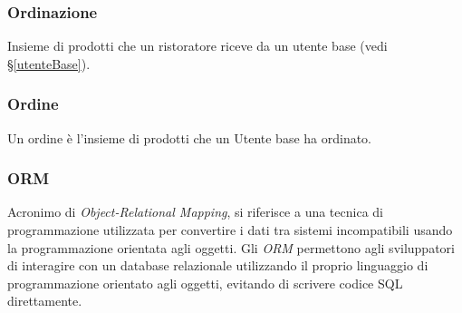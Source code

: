 
\subsubsection*{Ordinazione}
Insieme di prodotti che un ristoratore riceve da un utente base (vedi
\S\ref{utenteBase}).

\subsubsection*{Ordine}
\label{ordine}
Un ordine è l'insieme di prodotti che un Utente base ha ordinato.

\subsubsection*{ORM}
Acronimo di \textit{Object-Relational Mapping}, si riferisce a una tecnica di programmazione 
utilizzata per convertire i dati tra sistemi incompatibili usando la programmazione orientata agli oggetti. 
Gli \textit{ORM} permettono agli sviluppatori di interagire con un database relazionale utilizzando il proprio linguaggio 
di programmazione orientato agli oggetti, evitando di scrivere codice SQL direttamente.

\newpage
